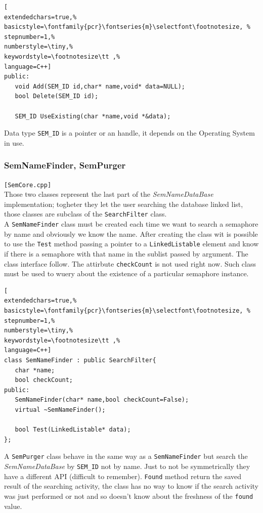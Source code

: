 \begin{lstlisting}[
extendedchars=true,%
basicstyle=\fontfamily{pcr}\fontseries{m}\selectfont\footnotesize, %
stepnumber=1,%
numberstyle=\tiny,%
keywordstyle=\footnotesize\tt ,%
language=C++]
public:
   void Add(SEM_ID id,char* name,void* data=NULL);
   bool Delete(SEM_ID id);

   SEM_ID UseExisting(char *name,void *&data);
\end{lstlisting}

Data type \texttt{SEM\_ID} is a pointer or an handle, it depends on the Operating System in use.



\subsubsection{SemNameFinder, SemPurger}
\texttt{[SemCore.cpp]}\\
Those two classes represent the last part of the \textit{SemNameDataBase} implementation; togheter they let the user searching the database linked list, those classes are subclass of the \texttt{SearchFilter} class.\\


A \texttt{SemNameFinder} class must be created each time we want to search a semaphore by name and obviously we know the name. After creating the class wit is possible to use the \texttt{Test} method passing a pointer to a \texttt{LinkedListable} element and know if there is a semaphore with that name in the sublist passed by argument. The class interface follow. The attirbute \texttt{checkCount} is not used right now. Such class must be used to wuery about the existence of a particular semaphore instance.

\begin{lstlisting}[
extendedchars=true,%
basicstyle=\fontfamily{pcr}\fontseries{m}\selectfont\footnotesize, %
stepnumber=1,%
numberstyle=\tiny,%
keywordstyle=\footnotesize\tt ,%
language=C++]
class SemNameFinder : public SearchFilter{
   char *name;
   bool checkCount;
public:
   SemNameFinder(char* name,bool checkCount=False);
   virtual ~SemNameFinder();

   bool Test(LinkedListable* data);
};
\end{lstlisting}

A \texttt{SemPurger} class behave in the same way as a \texttt{SemNameFinder} but search the \textit{SemNameDataBase} by \texttt{SEM\_ID} not by name. Just to not be symmetrically they have a different API (difficult to remember). \texttt{Found} method return the saved result of the searching activity, the class has no way to know if the search activity was just performed or not and so doesn't know about the freshness of the \texttt{found} value.

